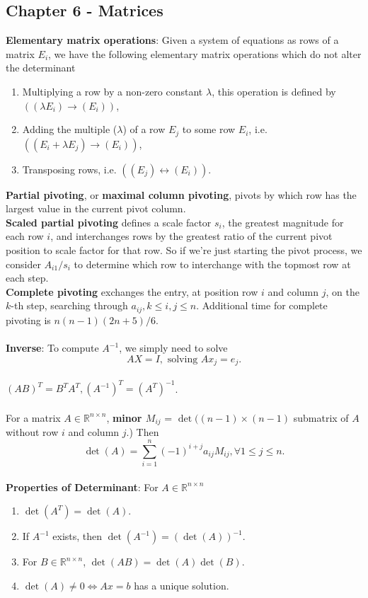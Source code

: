 \documentclass{article}
\begin{document}
\subsection*{Chapter 6 - Matrices}
\textbf{Elementary matrix operations}: Given a system of equations as rows of a matrix $E_i$, we have the following elementary matrix operations which do not alter the determinant \begin{enumerate}
    \item Multiplying a row by a non-zero constant $\lambda$, this operation is defined by $((\lambda E_i) \rightarrow (E_i))$,
    \item Adding the multiple ($\lambda$) of a row $E_j$ to some row $E_i$, i.e. $((E_i + \lambda E_j) \rightarrow (E_i))$,
    \item Transposing rows, i.e. $((E_j) \leftrightarrow (E_i))$.
\end{enumerate} $ $ \\
\textbf{Partial pivoting}, or \textbf{maximal column pivoting}, pivots by which row has the largest value in the current pivot column. \\
\textbf{Scaled partial pivoting} defines a scale factor $s_i$, the greatest magnitude for each row $i$, and interchanges rows by the greatest ratio of the current pivot position to scale factor for that row. So if we're just starting the pivot process, we consider $A_{i1}/s_i$ to determine which row to interchange with the topmost row at each step. \\
\textbf{Complete pivoting} exchanges the entry, at position row $i$ and column $j$, on the $k$-th step, searching through $a_{ij}, k \leq i, j \leq n$. Additional time for complete pivoting is $n(n - 1)(2n + 5)/6$. \\ \\
\textbf{Inverse}: To compute $A^{-1}$, we simply need to solve $$AX = I, \text{ solving } Ax_j = e_j.$$ \\
$(AB)^T = B^TA^T, (A^{-1})^T = (A^T)^{-1}$. \\ \\
For a matrix $A \in \mathbb{R}^{n \times n}$, \textbf{minor $M_{ij}$} = $\det((n - 1) \times (n - 1)$ submatrix of $A$ without row $i$ and column $j$.) Then $$\det(A) = \sum_{i = 1}^n (-1)^{i + j} a_{ij} M_{ij}, \forall 1 \leq j \leq n.$$ \\
\textbf{Properties of Determinant}: For $A \in \mathbb{R}^{n \times n}$ \begin{enumerate}
    \item $\det(A^T) = \det(A)$.
    \item If $A^{-1}$ exists, then $\det(A^{-1}) = (\det(A))^{-1}$.
    \item For $B \in \mathbb{R}^{n \times n}$, $\det(AB) = \det(A) \det(B)$.
    \item $\det(A) \neq 0 \iff Ax = b$ has a unique solution.
\end{enumerate} $ $ \\
\end{document}
